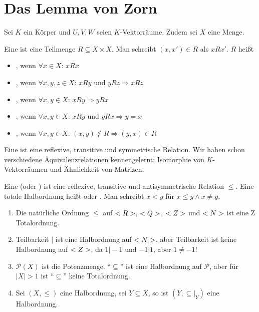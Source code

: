 \section{Das Lemma von Zorn}

Sei $K$ ein Körper und $U,V,W$ seien $K$-Vektorräume. Zudem sei $X$ eine Menge.

\begin{definition}[Relation]
	Eine  ist eine Teilmenge $R\subseteq X\times X$. Man schreibt $(x,x')\in R$ als $xRx'$. $R$ heißt
	\begin{itemize}
		\item {}, wenn $\forall  x\in X$: $xRx$
		\item {}, wenn $\forall x,y,z\in X$: $xRy$ und $yRz\Rightarrow xRz$
		\item {}, wenn $\forall x,y\in X$: $xRy\Rightarrow yRx$
		\item {}, wenn $\forall x,y\in X$: $xRy$ und $yRx\Rightarrow y=x$
		\item {}, wenn $\forall x,y\in X$: $(x,y)\notin R\Rightarrow (y,x)\in R$
	\end{itemize}
\end{definition}

\begin{example}[Äquivalenzrelation]
	Eine  ist eine reflexive, transitive und symmetrische Relation. Wir haben schon verschiedene Äquivalenzrelationen kennengelernt: Isomorphie von $K$-Vektorräumen und Ähnlichkeit von Matrizen.
\end{example}

\begin{definition}[Halbordnung]
	Eine  (oder ) ist eine reflexive, transitive und antisymmetrische Relation $\le$. Eine totale Halbordnung heißt  oder . Man schreibt $x<y$ für $x\le y\land x\neq y$.
\end{definition}

\begin{example}
	\begin{enumerate}
		\item Die natürliche Ordnung $\le$ auf $<R>$, $<Q>$, $<Z>$ und $<N>$ ist eine Z
		Totalordnung.
		\item Teilbarkeit $\vert$ ist eine Halbordnung auf $<N>$, aber Teilbarkeit ist keine Halbordnung auf $<Z>$, da $1\vert -1$ und $-1\vert 1$, aber $1\neq -1$!
		\item $\mathcal{P}(X)$ ist die Potenzmenge. ``$\subseteq$'' ist eine Halbordnung auf $\mathcal{P}$, aber für $\vert X\vert>1$ ist ``$\subseteq$'' keine Totalordnung.
		\item Sei $(X,\le)$ eine Halbordnung, sei $Y\subseteq X$, so ist $(Y,\subseteq\vert_Y)$ eine Halbordnung.
	\end{enumerate}
\end{example}

